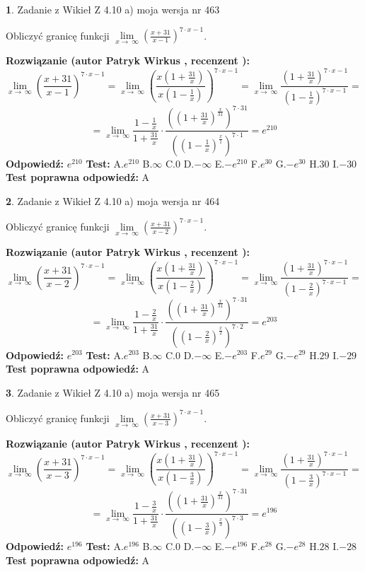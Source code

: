 \documentclass[12pt, a4paper]{article}
\theoremstyle{definition} %
\newtheorem{zad}{}
\newcommand{\zadStart}[1]{\begin{zad}#1\newline}
\newcommand{\zadStop}{\end{zad}}
\newcommand{\rozwStart}[2]{\noindent \textbf{Rozwiązanie (autor #1 , recenzent #2): }\newline}
\newcommand{\rozwStop}{\newline}
\newcommand{\odpStart}{\noindent \textbf{Odpowiedź:}\newline}
\newcommand{\odpStop}{\newline}
\newcommand{\testStart}{\noindent \textbf{Test:}\newline}
\newcommand{\testStop}{\newline}
\newcommand{\kluczStart}{\noindent \textbf{Test poprawna odpowiedź:}\newline}
\newcommand{\kluczStop}{\newline}
\begin{document}
\zadStart{Zadanie z Wikieł Z 4.10 a) moja wersja nr 463}

Obliczyć granicę funkcji  $\lim\limits_{x\to\ \infty}(\frac{x+31}{x-1})^{7\cdot x-1}$.
\zadStop
\rozwStart{Patryk Wirkus}{}
$$\lim\limits_{x\to\ \infty}(\frac{x+31}{x-1})^{7\cdot x-1} = \lim\limits_{x\to\ \infty}(\frac{x(1+\frac{31}{x})}{x(1-\frac{1}{x})})^{7\cdot x-1}=\lim\limits_{x\to\ \infty}\frac{(1+\frac{31}{x})^{7\cdot x-1}}{(1-\frac{1}{x})^{7\cdot x-1}}=$$
$$=\lim\limits_{x\to\ \infty}\frac{1-\frac{1}{x}}{1+\frac{31}{x}}\cdot\frac{((1+\frac{31}{x})^{\frac{x}{31}})^{7\cdot31}}{((1-\frac{1}{x})^{\frac{x}{1}})^{7\cdot1}}=e^{210}$$
\rozwStop
\odpStart
$e^{210}$
\odpStop
\testStart
A.$e^{210}$ B.$\infty$ C.$0$ D.$-\infty$ E.$-e^{210}$
F.$e^{30}$ G.$-e^{30}$
H.$30$
I.$-30$
\testStop
\kluczStart
A
\kluczStop



\zadStart{Zadanie z Wikieł Z 4.10 a) moja wersja nr 464}

Obliczyć granicę funkcji  $\lim\limits_{x\to\ \infty}(\frac{x+31}{x-2})^{7\cdot x-1}$.
\zadStop
\rozwStart{Patryk Wirkus}{}
$$\lim\limits_{x\to\ \infty}(\frac{x+31}{x-2})^{7\cdot x-1} = \lim\limits_{x\to\ \infty}(\frac{x(1+\frac{31}{x})}{x(1-\frac{2}{x})})^{7\cdot x-1}=\lim\limits_{x\to\ \infty}\frac{(1+\frac{31}{x})^{7\cdot x-1}}{(1-\frac{2}{x})^{7\cdot x-1}}=$$
$$=\lim\limits_{x\to\ \infty}\frac{1-\frac{2}{x}}{1+\frac{31}{x}}\cdot\frac{((1+\frac{31}{x})^{\frac{x}{31}})^{7\cdot31}}{((1-\frac{2}{x})^{\frac{x}{2}})^{7\cdot2}}=e^{203}$$
\rozwStop
\odpStart
$e^{203}$
\odpStop
\testStart
A.$e^{203}$ B.$\infty$ C.$0$ D.$-\infty$ E.$-e^{203}$
F.$e^{29}$ G.$-e^{29}$
H.$29$
I.$-29$
\testStop
\kluczStart
A
\kluczStop



\zadStart{Zadanie z Wikieł Z 4.10 a) moja wersja nr 465}

Obliczyć granicę funkcji  $\lim\limits_{x\to\ \infty}(\frac{x+31}{x-3})^{7\cdot x-1}$.
\zadStop
\rozwStart{Patryk Wirkus}{}
$$\lim\limits_{x\to\ \infty}(\frac{x+31}{x-3})^{7\cdot x-1} = \lim\limits_{x\to\ \infty}(\frac{x(1+\frac{31}{x})}{x(1-\frac{3}{x})})^{7\cdot x-1}=\lim\limits_{x\to\ \infty}\frac{(1+\frac{31}{x})^{7\cdot x-1}}{(1-\frac{3}{x})^{7\cdot x-1}}=$$
$$=\lim\limits_{x\to\ \infty}\frac{1-\frac{3}{x}}{1+\frac{31}{x}}\cdot\frac{((1+\frac{31}{x})^{\frac{x}{31}})^{7\cdot31}}{((1-\frac{3}{x})^{\frac{x}{3}})^{7\cdot3}}=e^{196}$$
\rozwStop
\odpStart
$e^{196}$
\odpStop
\testStart
A.$e^{196}$ B.$\infty$ C.$0$ D.$-\infty$ E.$-e^{196}$
F.$e^{28}$ G.$-e^{28}$
H.$28$
I.$-28$
\testStop
\kluczStart
A
\kluczStop
\end{document}
